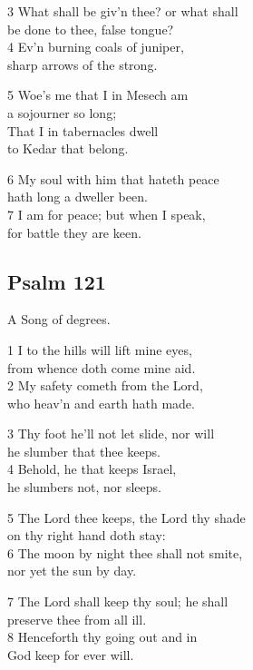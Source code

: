 3 What shall be giv’n thee? or what shall\\
be done to thee, false tongue?\\
4 Ev’n burning coals of juniper,\\
sharp arrows of the strong.

5 Woe’s me that I in Mesech am\\
a sojourner so long;\\
That I in tabernacles dwell\\
to Kedar that belong.

6 My soul with him that hateth peace\\
hath long a dweller been.\\
7 I am for peace; but when I speak,\\
for battle they are keen.

\begin{center}
\quad{}\quad{}
\end{center}

\subsection*{Psalm 121}

A Song of degrees.

1 I to the hills will lift mine eyes,\\
from whence doth come mine aid.\\
2 My safety cometh from the Lord,\\
who heav’n and earth hath made.

3 Thy foot he’ll not let slide, nor will\\
he slumber that thee keeps.\\
4 Behold, he that keeps Israel,\\
he slumbers not, nor sleeps.

5 The Lord thee keeps, the Lord thy shade\\
on thy right hand doth stay:\\
6 The moon by night thee shall not smite,\\
nor yet the sun by day.

7 The Lord shall keep thy soul; he shall\\
preserve thee from all ill.\\
8 Henceforth thy going out and in\\
God keep for ever will.

